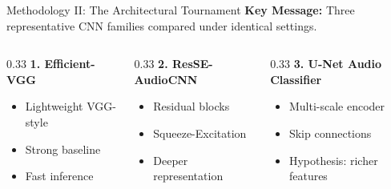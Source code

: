 \documentclass[aspectratio=169,xcolor=dvipsnames]{beamer}
\begin{document}
\begin{frame}{Methodology II: The Architectural Tournament}
  \textbf{Key Message:} Three representative CNN families compared under identical settings.\\[4pt]
  \begin{columns}[T]
    \begin{column}{0.33\textwidth}
      \textbf{1. Efficient-VGG}
      \begin{itemize}\itemsep4pt
        \item Lightweight VGG-style
        \item Strong baseline
        \item Fast inference
      \end{itemize}
    \end{column}
    \begin{column}{0.33\textwidth}
      \textbf{2. ResSE-AudioCNN}
      \begin{itemize}\itemsep4pt
        \item Residual blocks
        \item Squeeze-Excitation
        \item Deeper representation
      \end{itemize}
    \end{column}
    \begin{column}{0.33\textwidth}
      \textbf{3. U-Net Audio Classifier}
      \begin{itemize}\itemsep4pt
        \item Multi-scale encoder
        \item Skip connections
        \item Hypothesis: richer features
      \end{itemize}
    \end{column}
  \end{columns}
\end{frame}
\end{document}
